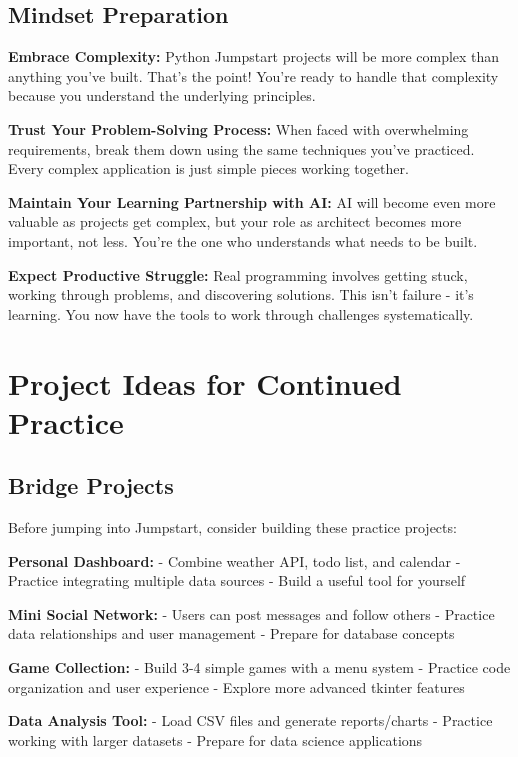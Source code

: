 \documentclass[
  letterpaper,
  DIV=11,
  numbers=noendperiod,
  oneside]{scrreprt}
\begin{document}
\subsection{Mindset Preparation}\label{mindset-preparation}

\textbf{Embrace Complexity:} Python Jumpstart projects will be more
complex than anything you've built. That's the point! You're ready to
handle that complexity because you understand the underlying principles.

\textbf{Trust Your Problem-Solving Process:} When faced with
overwhelming requirements, break them down using the same techniques
you've practiced. Every complex application is just simple pieces
working together.

\textbf{Maintain Your Learning Partnership with AI:} AI will become even
more valuable as projects get complex, but your role as architect
becomes more important, not less. You're the one who understands what
needs to be built.

\textbf{Expect Productive Struggle:} Real programming involves getting
stuck, working through problems, and discovering solutions. This isn't
failure - it's learning. You now have the tools to work through
challenges systematically.

\section{Project Ideas for Continued
Practice}\label{project-ideas-for-continued-practice}

\subsection{Bridge Projects}\label{bridge-projects}

Before jumping into Jumpstart, consider building these practice
projects:

\textbf{Personal Dashboard:} - Combine weather API, todo list, and
calendar - Practice integrating multiple data sources - Build a useful
tool for yourself

\textbf{Mini Social Network:} - Users can post messages and follow
others - Practice data relationships and user management - Prepare for
database concepts

\textbf{Game Collection:} - Build 3-4 simple games with a menu system -
Practice code organization and user experience - Explore more advanced
tkinter features

\textbf{Data Analysis Tool:} - Load CSV files and generate
reports/charts - Practice working with larger datasets - Prepare for
data science applications
\end{document}
